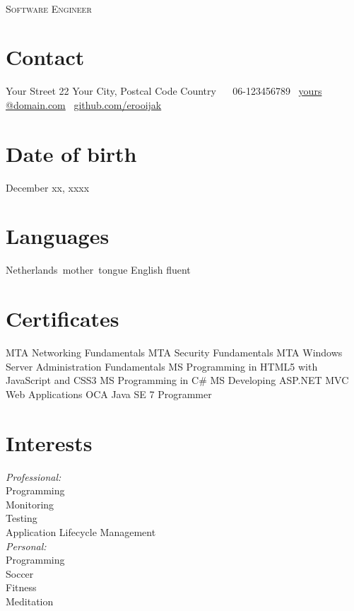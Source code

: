 \documentclass[]{friggeri-cv} %
\begin{document}
\\{\selectfont\scshape Software Engineer }\\
{\selectfont\scshape  } %



\begin{aside} %
\section{Contact}
Your Street 22
Your City, Postcal Code
Country
~
\Mobilefone ~06-123456789
\Letter ~\href{mailto:yours@domain.com}{yours\\@domain.com}
\Keyboard ~\href{https://www.github.com/erooijak}{github.com/erooijak}
~
\section{Date of birth}
December xx, xxxx
\section{Languages}
Netherlands~mother~tongue
English fluent
~
\section{Certificates}
MTA Networking
Fundamentals
MTA Security Fundamentals
MTA Windows Server
Administration
Fundamentals
MS Programming in HTML5 with JavaScript and CSS3
MS Programming in C\#
MS Developing ASP.NET MVC Web Applications
OCA Java SE 7 Programmer
~
\section{Interests}
\emph{Professional:} \\Programming\\ Monitoring \\Testing \\Application Lifecycle Management \\\emph{Personal:} \\Programming \\Soccer \\Fitness \\Meditation
\end{aside}
\end{document}

